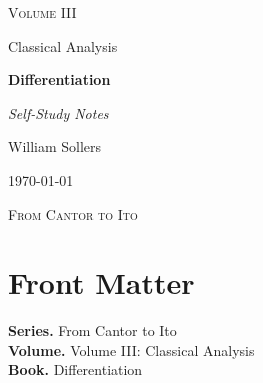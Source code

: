 \documentclass[12pt, a4paper]{report}
\begin{document}
\ExplSyntaxOff
\renewcommand{\familydefault}{\rmdefault}

\begin{titlepage}
\centering
\vspace*{3.5cm}

{\Large\scshape Volume III\par}
\vspace{0.35cm}
{\large Classical Analysis\par}

\vspace{1.4cm}

{\Huge\bfseries Differentiation\par}

\vspace{0.6cm}
{\large\itshape Self-Study Notes\par}

\vfill

{\large William Sollers\par}
\vspace{0.35cm}
{\large \today\par}

\vfill

{\large\scshape From Cantor to Ito\par}
\end{titlepage}

\clearpage
\thispagestyle{plain}
\chapter*{Front Matter}
\noindent\textbf{Series.} From Cantor to Ito\\[0.5em]
\textbf{Volume.} Volume III: Classical Analysis\\[0.5em]
\textbf{Book.} Differentiation

\clearpage
\tableofcontents
\clearpage
{}



\clearpage



\printindex[tech]
\printindex[dep]
\end{document}
